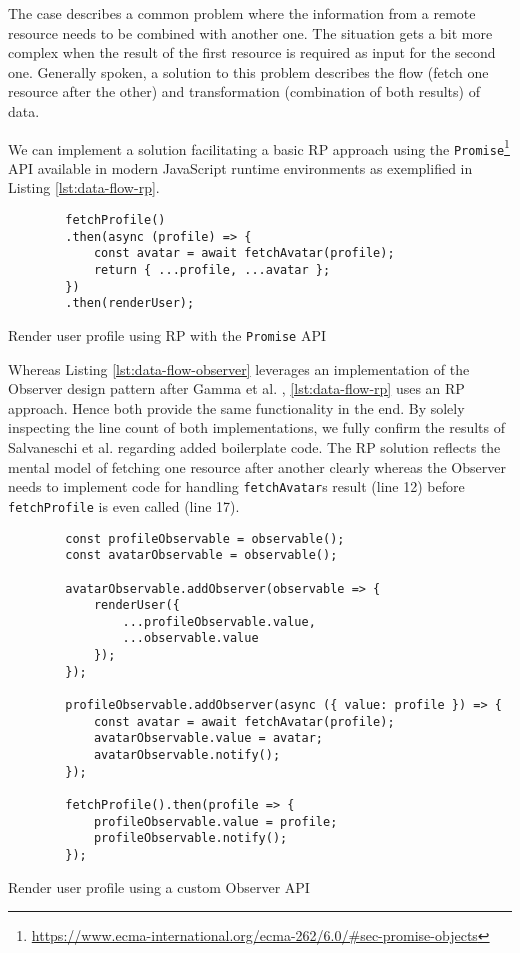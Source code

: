 \documentclass[12pt,a4paper]{article}
\begin{document}
The case describes a common problem where the information from a remote resource needs to be combined with another one. The situation gets a bit more complex when the result of the first resource is required as input for the second one. Generally spoken, a solution to this problem describes the flow (fetch one resource after the other) and transformation (combination of both results) of data.

We can implement a solution facilitating a basic RP approach using the \texttt{Promise}\footnote{\url{https://www.ecma-international.org/ecma-262/6.0/\#sec-promise-objects}} API available in modern JavaScript runtime environments as exemplified in Listing \ref{lst:data-flow-rp}.

\begin{listing}
	\begin{verbatim}
		fetchProfile()
		.then(async (profile) => {
			const avatar = await fetchAvatar(profile);
			return { ...profile, ...avatar };
		})
		.then(renderUser);
	\end{verbatim}
	\caption{Render user profile using RP with the \texttt{Promise} API}
	\label{lst:data-flow-rp}
\end{listing}

Whereas Listing \ref{lst:data-flow-observer} leverages an implementation of the Observer design pattern after Gamma et al. \cite{gamma1995design}, \ref{lst:data-flow-rp} uses an RP approach. Hence both provide the same functionality in the end. By solely inspecting the line count of both implementations, we fully confirm the results of Salvaneschi et al. \cite{7827078} regarding added boilerplate code. The RP solution reflects the mental model of fetching one resource after another clearly whereas the Observer needs to implement code for handling \texttt{fetchAvatar}s result (line 12) before \texttt{fetchProfile} is even called (line 17).

\begin{listing}
	\begin{verbatim}
		const profileObservable = observable();
		const avatarObservable = observable();

		avatarObservable.addObserver(observable => {
			renderUser({
				...profileObservable.value,
				...observable.value
			});
		});

		profileObservable.addObserver(async ({ value: profile }) => {
			const avatar = await fetchAvatar(profile);
			avatarObservable.value = avatar;
			avatarObservable.notify();
		});

		fetchProfile().then(profile => {
			profileObservable.value = profile;
			profileObservable.notify();
		});
	\end{verbatim}
	\caption{Render user profile using a custom Observer API}
	\label{lst:data-flow-observer}
\end{listing}
\end{document}
